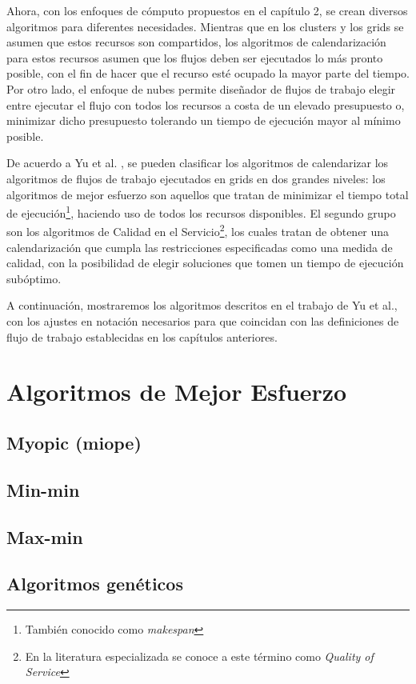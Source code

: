 \documentclass[letterpaper, 12pt]{report}
\begin{document}
Ahora, con los enfoques de cómputo propuestos en el capítulo 2, se crean diversos algoritmos para diferentes necesidades. Mientras que en los clusters y los grids se asumen que estos recursos son compartidos, los algoritmos de calendarización para estos recursos asumen que los flujos deben ser ejecutados lo más pronto posible, con el fin de hacer que el recurso esté ocupado la mayor parte del tiempo. Por otro lado, el enfoque de nubes permite diseñador de flujos de trabajo elegir entre ejecutar el flujo con todos los recursos a costa de un elevado presupuesto o, minimizar dicho presupuesto tolerando un tiempo de ejecución mayor al mínimo posible.

De acuerdo a Yu et al. \cite{yu2008workflow}, se pueden clasificar los algoritmos de calendarizar los algoritmos de flujos de trabajo ejecutados en grids en dos grandes niveles: los algoritmos de mejor esfuerzo son aquellos que tratan de minimizar el tiempo total de ejecución\footnote{También conocido como \emph{makespan}}, haciendo uso de todos los recursos disponibles. El segundo grupo son los algoritmos de Calidad en el Servicio\footnote{En la literatura especializada se conoce a este término como \emph{Quality of Service}}, los cuales tratan de obtener una calendarización que cumpla las restricciones especificadas como una medida de calidad, con la posibilidad de elegir soluciones que tomen un tiempo de ejecución subóptimo.

A continuación, mostraremos los algoritmos descritos en el trabajo de Yu et al., con los ajustes en notación necesarios para que coincidan con las definiciones de flujo de trabajo establecidas en los capítulos anteriores.


\section{Algoritmos de Mejor Esfuerzo}


\subsection{Myopic (miope)}

\subsection{Min-min}
\subsection{Max-min}
\subsection{Algoritmos genéticos}
\end{document}
